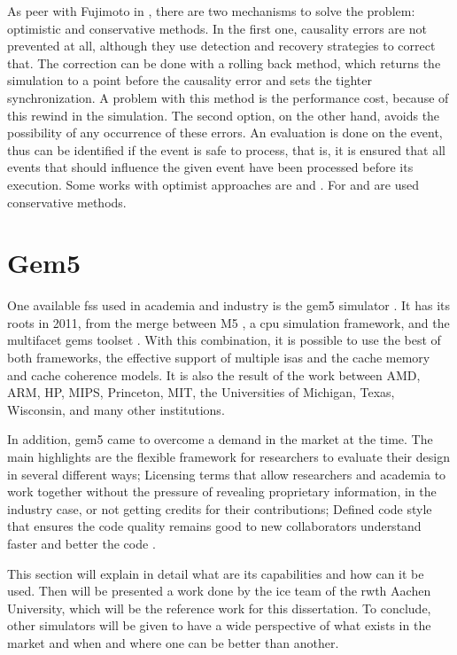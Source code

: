 As peer with Fujimoto in \cite{PDESfujimoto}, there are two mechanisms to solve the problem: optimistic and conservative methods. In the first one, causality errors are not prevented at all, although they use detection and recovery strategies to correct that. The correction can be done with a rolling back method, which returns the simulation to a point before the causality error and sets the tighter synchronization. A problem with this method is the performance cost, because of this rewind in the simulation. The second option, on the other hand, avoids the possibility of any occurrence of these errors. An evaluation is done on the event, thus can be identified if the event is safe to process, that is, it is ensured that all events that should influence the given event have been processed before its execution. Some works with optimist approaches are \cite{busnot2020standard} and \cite{optimist2}. For \cite{dist-gem5} and \cite{asynchronousSimulator} are used conservative methods.

\section{Gem5}

One available \gls{fss} used in academia and industry is the gem5 simulator \cite{TheGem5Simulator}\cite{Thegem5simulatorV2}. It has its roots in 2011, from the merge between M5 \cite{TheM5Simulator}, a \gls{cpu} simulation framework, and the multifacet \gls{gems} toolset \cite{TheGEMS}. With this combination, it is possible to use the best of both frameworks, the effective support of multiple \glspl{isa} and the cache memory and cache coherence models. It is also the result of the work between AMD, ARM, HP, MIPS, Princeton, MIT, the Universities of Michigan, Texas, Wisconsin, and many other institutions.

In addition, gem5 came to overcome a demand in the market at the time. The main highlights are the flexible framework for researchers to evaluate their design in several different ways; Licensing terms that allow researchers and academia to work together without the pressure of revealing proprietary information, in the industry case, or not getting credits for their contributions; Defined code style that ensures the code quality remains good to new collaborators understand faster and better the code \cite{TheGem5Simulator}. 

This section will explain in detail what are its capabilities and how can it be used. Then will be presented a work done by the \gls{ice} team of the \gls{rwth} Aachen University, which will be the reference work for this dissertation. To conclude, other simulators will be given to have a wide perspective of what exists in the market and when and where one can be better than another. 

